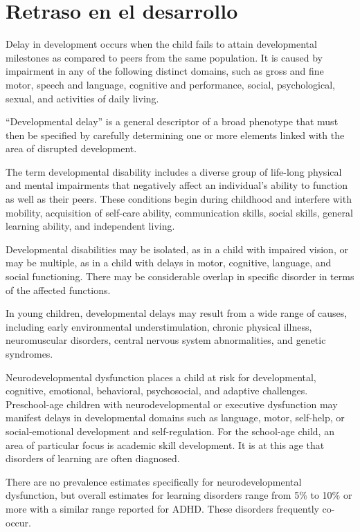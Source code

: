\section{Retraso en el desarrollo}

Delay in development occurs when the child fails to attain developmental
milestones as compared to peers from the same population. It is caused by
impairment in any of the following distinct domains, such as gross and fine
motor, speech and language, cognitive and performance, social, psychological,
sexual, and activities of daily living. \cite{DevelopmentalDelay}

``Developmental delay'' is a general descriptor of a broad phenotype that must
then be specified by carefully determining one or more elements linked with the
area of disrupted development. \cite{DevelopmentalDelay}

The term developmental disability includes a diverse group of life-long
physical and mental impairments that negatively affect an individual’s ability
to function as well as their peers. These conditions begin during childhood and
interfere with mobility, acquisition of self-care ability, communication
skills, social skills, general learning ability, and independent living.
\cite{Simms2023}

Developmental disabilities may be isolated, as in a child with impaired vision,
or may be multiple, as in a child with delays in motor, cognitive, language,
and social functioning. There may be considerable overlap in specific disorder
in terms of the affected functions. \cite{Simms2023}

In young children, developmental delays may result from a wide range of causes,
including early environmental understimulation, chronic physical illness,
neuromuscular disorders, central nervous system abnormalities, and genetic
syndromes. \cite{Simms2023}

Neurodevelopmental dysfunction places a child at risk for developmental,
cognitive, emotional, behavioral, psychosocial, and adaptive challenges.
Preschool-age children with neurodevelopmental or executive dysfunction may
manifest delays in developmental domains such as language, motor, self-help, or
social-emotional development and self-regulation. For the school-age child, an
area of particular focus is academic skill development. It is at this age that
disorders of learning are often diagnosed. \cite{Nelson49}

There are no prevalence estimates specifically for neurodevelopmental
dysfunction, but overall estimates for learning disorders range from 5\% to
10\% or more with a similar range reported for ADHD. These disorders frequently
co-occur.
